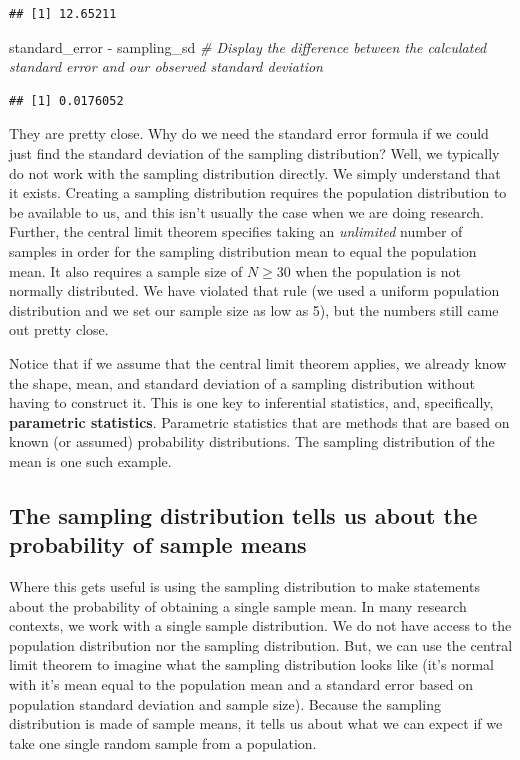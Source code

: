 \documentclass[
]{book}
\newenvironment{Shaded}{\begin{snugshade}}{\end{snugshade}}
\newcommand{\CommentTok}[1]{\textcolor[rgb]{0.56,0.35,0.01}{\textit{#1}}}
\newcommand{\NormalTok}[1]{#1}
\newcommand{\SpecialCharTok}[1]{\textcolor[rgb]{0.00,0.00,0.00}{#1}}
\begin{document}
\begin{verbatim}
## [1] 12.65211
\end{verbatim}

\begin{Shaded}
\begin{Highlighting}[]
\NormalTok{standard\_error }\SpecialCharTok{{-}}\NormalTok{ sampling\_sd }\CommentTok{\# Display the difference between the calculated standard error and our observed standard deviation}
\end{Highlighting}
\end{Shaded}

\begin{verbatim}
## [1] 0.0176052
\end{verbatim}

They are pretty close. Why do we need the standard error formula if we could just find the standard deviation of the sampling distribution? Well, we typically do not work with the sampling distribution directly. We simply understand that it exists. Creating a sampling distribution requires the population distribution to be available to us, and this isn't usually the case when we are doing research. Further, the central limit theorem specifies taking an \emph{unlimited} number of samples in order for the sampling distribution mean to equal the population mean. It also requires a sample size of \(N\ge30\) when the population is not normally distributed. We have violated that rule (we used a uniform population distribution and we set our sample size as low as 5), but the numbers still came out pretty close.

Notice that if we assume that the central limit theorem applies, we already know the shape, mean, and standard deviation of a sampling distribution without having to construct it. This is one key to inferential statistics, and, specifically, \textbf{parametric statistics}. Parametric statistics that are methods that are based on known (or assumed) probability distributions. The sampling distribution of the mean is one such example.

\hypertarget{the-sampling-distribution-tells-us-about-the-probability-of-sample-means}{%
\subsection{The sampling distribution tells us about the probability of sample means}\label{the-sampling-distribution-tells-us-about-the-probability-of-sample-means}}

Where this gets useful is using the sampling distribution to make statements about the probability of obtaining a single sample mean. In many research contexts, we work with a single sample distribution. We do not have access to the population distribution nor the sampling distribution. But, we can use the central limit theorem to imagine what the sampling distribution looks like (it's normal with it's mean equal to the population mean and a standard error based on population standard deviation and sample size). Because the sampling distribution is made of sample means, it tells us about what we can expect if we take one single random sample from a population.
\end{document}
